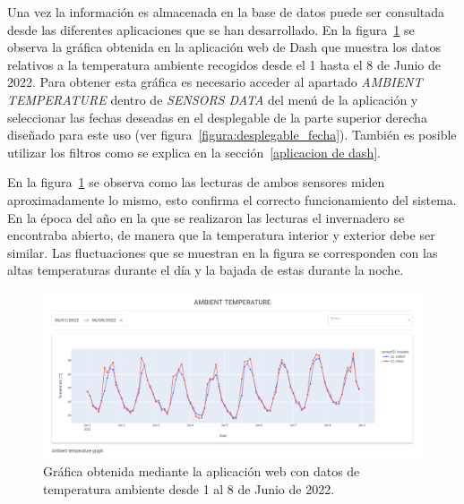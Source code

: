 \documentclass[a4paper, 12pt, oneside]{book}
\begin{document}
Una vez la información es almacenada en la base de datos puede ser consultada desde las diferentes aplicaciones que se han desarrollado.
En la figura~\ref{figura:ambient_temperature_01_08_junio} se observa la gráfica obtenida en la aplicación web de Dash que muestra los datos relativos a la temperatura ambiente recogidos desde el 1 hasta el 8 de Junio de 2022. Para obtener esta gráfica es necesario acceder al apartado \textit{AMBIENT TEMPERATURE} dentro de \textit{SENSORS DATA} del menú de la aplicación y seleccionar las fechas deseadas en el desplegable de la parte superior derecha diseñado para este uso (ver figura~\ref{figura:desplegable_fecha}). También es posible utilizar los filtros como se explica en la sección~\ref{aplicacion de dash}.

En la figura~\ref{figura:ambient_temperature_01_08_junio} se observa como las lecturas de ambos sensores miden aproximadamente lo mismo, esto confirma el correcto funcionamiento del sistema. En la época del año en la que se realizaron las lecturas el invernadero se encontraba abierto, de manera que la temperatura interior y exterior debe ser similar. Las fluctuaciones que se muestran en la figura se corresponden con las altas temperaturas durante el día y la bajada de estas durante la noche.

\begin{figure}[H]
	\centering
    \includegraphics[width=12cm, keepaspectratio]{img/ambient_temperature_01_08_junio}
    \caption{Gráfica obtenida mediante la aplicación web con datos de temperatura ambiente desde 1 al 8 de Junio de 2022.}
    \label{figura:ambient_temperature_01_08_junio}
\end{figure}
\end{document}
